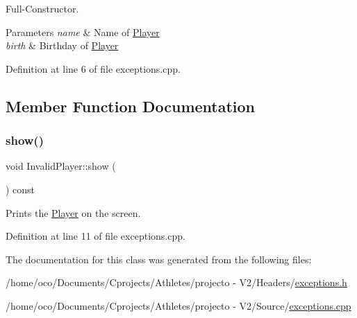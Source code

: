 Full-\/\+Constructor. 


\begin{DoxyParams}{Parameters}
{\em name} & Name of \hyperlink{class_player}{Player} \\
\hline
{\em birth} & Birthday of \hyperlink{class_player}{Player} \\
\hline
\end{DoxyParams}


Definition at line 6 of file exceptions.\+cpp.



\subsection{Member Function Documentation}
\hypertarget{class_invalid_player_a5254e7755b435020a786a2de1c20418f}{}\label{class_invalid_player_a5254e7755b435020a786a2de1c20418f} 
\subsubsection{\texorpdfstring{show()}{show()}}
{\footnotesize\ttfamily void Invalid\+Player\+::show (\begin{DoxyParamCaption}{ }\end{DoxyParamCaption}) const}



Prints the \hyperlink{class_player}{Player} on the screen. 



Definition at line 11 of file exceptions.\+cpp.



The documentation for this class was generated from the following files\+:\begin{DoxyCompactItemize}
\item 
/home/oco/\+Documents/\+Cprojects/\+Athletes/projecto -\/ V2/\+Headers/\hyperlink{exceptions_8h}{exceptions.\+h}\item 
/home/oco/\+Documents/\+Cprojects/\+Athletes/projecto -\/ V2/\+Source/\hyperlink{exceptions_8cpp}{exceptions.\+cpp}\end{DoxyCompactItemize}
